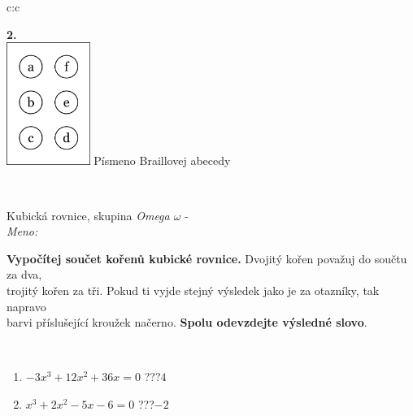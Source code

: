 \documentclass[10pt]{report}
\begin{document}
\begin{tabular}{c:c}
\begin{minipage}[c][104.5mm][t]{0.5\linewidth}
\begin{center}
\begin{minipage}{0.79\linewidth}
\begin{center}
\begin{varwidth}{\linewidth}
\begin{enumerate}
\end{enumerate}
\end{varwidth}
\end{center}
\end{minipage}
\begin{minipage}{0.20\linewidth}
\begin{center}
{\Huge\bfseries 2.} \\[2mm]
\includegraphics[height=40mm]{../images/braille.png}
{\small Písmeno Braillovej abecedy}
\end{center}
\end{minipage}
\end{center}
\end{minipage}
\\ \hdashline
\begin{minipage}[c][104.5mm][t]{0.5\linewidth}
\begin{center}
\vspace{7mm}
{\huge Kubická rovnice, skupina \textit{Omega $\omega$} -}\\[5mm]
\textit{Meno:}\phantom{xxxxxxxxxxxxxxxxxxxxxxxxxxxxxxxxxxxxxxxxxxxxxxxxxxxxxxxxxxxxxxxxx}\\[5mm]
\begin{minipage}{0.95\linewidth}
\textbf{Vypočítej součet kořenů kubické rovnice.} Dvojitý kořen považuj do součtu za dva,\\trojitý kořen za tři. Pokud ti vyjde stejný výsledek jako je za otazníky, tak napravo\\barvi příslušející kroužek načerno. \textbf{Spolu odevzdejte výsledné slovo}.
\end{minipage}
\\[1mm]
\begin{minipage}{0.79\linewidth}
\begin{center}
\begin{varwidth}{\linewidth}
\begin{enumerate}
\Large
\item $-3x^3+12x^2+36x=0$\quad \dotfill\; ???\;\dotfill \quad $4$
\item $x^3+2x^2-5x-6=0$\quad \dotfill\; ???\;\dotfill \quad $-2$

\end{enumerate}
\end{varwidth}
\end{center}
\end{minipage}
\end{center}
\end{minipage}
\end{tabular}
\end{document}
